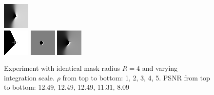 \begin{figure}[h]
    \includegraphics[width=0.2\linewidth]{../Images/disctest/flatcorner4inpaint.png}\\
    \vspace*{0.2cm}
    \includegraphics[width=0.2\linewidth]{../Images/disctest/flatcorner5.png}\hspace{0.2cm}
    \includegraphics[width=0.2\linewidth]{../Images/disctest/flatcorner5mask.png}\hspace{0.2cm}
    \includegraphics[width=0.2\linewidth]{../Images/disctest/flatcorner5inpaint.png}\\
    \caption{Experiment with identical mask radius $R=4$ and varying integration scale. $\rho$ from top to bottom:
    1, 2, 3, 4, 5. PSNR from top to bottom: 12.49, 12.49, 12.49, 11.31, 8.09}
    \label{fig:MaskEx}
\end{figure}

